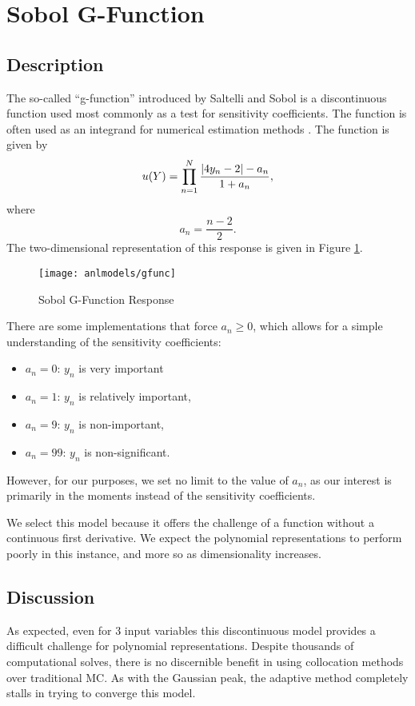 \section{Sobol G-Function}
\subsection{Description}\label{mod:gfunc}
The so-called ``g-function'' introduced by Saltelli and Sobol \cite{gfunc} is a discontinuous
function used most commonly as a test for sensitivity coefficients.  The function is often used as an integrand
for numerical estimation methods \cite{gfuncM}.
The function is given by
\begin{equation}
  u(Y) = \prod_{n=1}^N \frac{\abs{4y_n-2}-a_n}{1+a_n},
\end{equation}
where
\begin{equation}
  a_n = \frac{n-2}{2}.
\end{equation}
The two-dimensional representation of this response is given in Figure \ref{fig: g func}.
\begin{figure}[htb]
  \centering
  \texttt{[image: anlmodels/gfunc]}
  \caption{Sobol G-Function Response \cite{sfu}}
  \label{fig: g func}
\end{figure}

There are some implementations \cite{gfuncM} that force $a_n \geq 0$, which allows for a simple
understanding of the sensitivity coefficients:
\begin{itemize}
  \item $a_n=0$: $y_n$ is very important
  \item $a_n=1$: $y_n$ is relatively important,
  \item $a_n=9$: $y_n$ is non-important,
  \item $a_n=99$: $y_n$ is non-significant.
\end{itemize}
However, for our purposes, we set no limit to the value of $a_n$, as our interest is primarily in the moments
instead of the sensitivity coefficients.

We select this model because it offers the challenge of a function
without a continuous first derivative.  We expect the polynomial representations to perform poorly
in this instance, and more so as dimensionality increases.

\subsection{Discussion}
As expected, even for 3 input variables this discontinuous model provides a difficult challenge for
polynomial representations.  Despite thousands of computational solves, there is no discernible benefit in using
collocation methods over traditional MC.  As with the Gaussian peak, the adaptive method completely
stalls in trying to converge this model.
